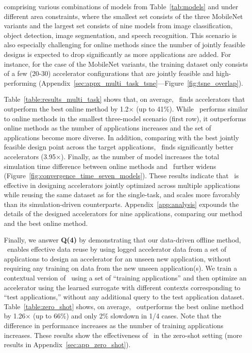 %
%
comprising various combinations of models from Table~\ref{tab:models} and under different area constraints, where the smallest set consists of the three MobileNet variants and the largest set consists of nine models from image classification, object detection, image segmentation, and speech recognition.
%
This scenario is also especially challenging for online methods since the number of jointly feasible designs is expected to drop significantly as more applications are added.
%
For instance, for the case of the MobileNet variants, the training dataset only consists of a few (20-30) accelerator configurations that are jointly feasible and high-performing (Appendix~\ref{sec:appx_multi_task_tsne}---Figure~\ref{fig:tsne_overlap}). 

Table~\ref{table:results_multi_task} shows that, on average, \primemethodname\ finds accelerators that outperform the best online method by 1.2$\times$ (up to 41\%).
%
While \primemethodname\ performs similar to online methods in the smallest three-model scenario (first row), it outperforms online methods as the number of applications increases and the set of applications become more diverse.
%
In addition, comparing with the best jointly feasible design point across the target applications, \primemethodname\ finds significantly better accelerators (3.95$\times$).
%
Finally, as the number of model increases the total simulation time difference between online methods and \primemethodname\ further widens (Figure~\ref{fig:convergence_time_seven_models}).
%
These results indicate that \primemethodname\ is effective in designing accelerators jointly optimized across multiple applications while reusing the same dataset as for the single-task, and scales more favorably than its simulation-driven counterparts.
%
Appendix~\ref{app:analysis} expounds the details of the designed accelerators for nine applications, comparing our method and the best online method.

%
Finally, we answer \textbf{Q(4)} by demonstrating that our data-driven offline method, \primemethodname\ enables effective data reuse by using logged accelerator data from a set of applications to design an accelerator for an unseen new application, without requiring any training on data from the new unseen application(s).
%
We train a contextual version of \primemethodname\ using a set of ``training applications'' and then optimize an accelerator using the learned surrogate with different contexts corresponding to ``test applications,'' without any additional query to the test application dataset.
%
Table~\ref{table:zero_shot} shows, on average, \primemethodname\ outperforms the best online method by 1.26$\times$ (up to 66$\%$) and only 2$\%$ slowdown in 1/4 cases.
%
Note that the difference in performance increases as the number of training applications increases.
%
These results show the effectiveness of \primemethodname\ in the zero-shot setting (more results in Appendix~\ref{sec:app_zero_shot}).

